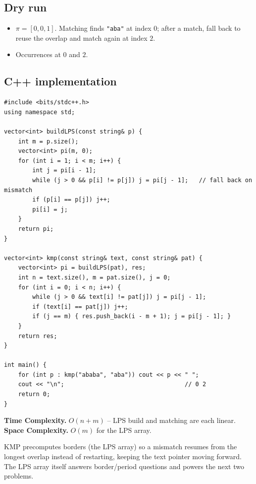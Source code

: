 \subsection*{Dry run}


\begin{itemize}
  \item $\pi=[0,0,1]$. Matching finds \texttt{"aba"} at index $0$; after a
        match, fall back to reuse the overlap and match again at index $2$.
  \item Occurrences at $0$ and $2$.
\end{itemize}

\subsection*{C++ implementation}

\begin{lstlisting}
#include <bits/stdc++.h>
using namespace std;

vector<int> buildLPS(const string& p) {
    int m = p.size();
    vector<int> pi(m, 0);
    for (int i = 1; i < m; i++) {
        int j = pi[i - 1];
        while (j > 0 && p[i] != p[j]) j = pi[j - 1];   // fall back on mismatch
        if (p[i] == p[j]) j++;
        pi[i] = j;
    }
    return pi;
}

vector<int> kmp(const string& text, const string& pat) {
    vector<int> pi = buildLPS(pat), res;
    int n = text.size(), m = pat.size(), j = 0;
    for (int i = 0; i < n; i++) {
        while (j > 0 && text[i] != pat[j]) j = pi[j - 1];
        if (text[i] == pat[j]) j++;
        if (j == m) { res.push_back(i - m + 1); j = pi[j - 1]; }
    }
    return res;
}

int main() {
    for (int p : kmp("ababa", "aba")) cout << p << " ";
    cout << "\n";                                  // 0 2
    return 0;
}
\end{lstlisting}

\begin{complexitybox}
\textbf{Time Complexity.} $O(n+m)$ -- LPS build and matching are each
linear. \textbf{Space Complexity.} $O(m)$ for the LPS array.
\end{complexitybox}

\begin{takeawaybox}
KMP precomputes borders (the LPS array) so a mismatch resumes from the
longest overlap instead of restarting, keeping the text pointer moving
forward. The LPS array itself answers border/period questions and powers the
next two problems.
\end{takeawaybox}
